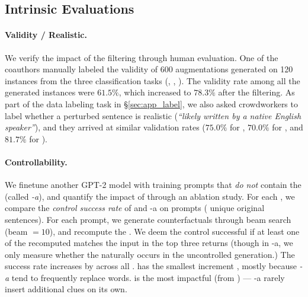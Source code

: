 



\subsection{Intrinsic Evaluations}
\label{subsec:intrinsic}
\paragraph{Validity / Realistic.}
We verify the impact of the filtering through human evaluation.
One of the coauthors manually labeled the validity of 600 augmentations generated on 120 instances from the three classification tasks (\sst, \nli, \qqp).
The validity rate among all the generated instances were $61.5\%$, which increased to $78.3\%$ after the filtering. 
As part of the data labeling task in \S\ref{sec:app_label}, we also asked crowdworkers to label whether a perturbed sentence is realistic (\emph{``likely written by a native English speaker''}), and they arrived at similar validation rates ($75.0\%$ for \dsst, $70.0\%$ for \dqqp, and $81.7\%$ for \dnli).


\paragraph{Controllability.}
We finetune another GPT-2 model with training prompts that \emph{do not} contain the \tagstrshorts (called \emph{\sysname-a}), and quantify the impact of \tagstrs through an ablation study.
For each \tagstr, we compare the \emph{control success rate} of \sysname and \sysname-a on  prompts ( unique original sentences).
For each prompt, we generate counterfactuals through beam search (beam $=10$), and recompute the \tagstrshorts.
We deem the control successful if at least one of the recomputed \tagstrshort matches the input in the top three returns (though in \sysname-a, we only measure whether the \tagstrshort naturally occurs in the uncontrolled generation.)
The success rate increases by  across all \tagstrs.
 has the smallest increment , mostly because \emph{\sysname-a} tend to frequently replace words.
 is the most impactful \tagstrshort (from ) --- \sysname-a rarely insert additional clues on its own.

